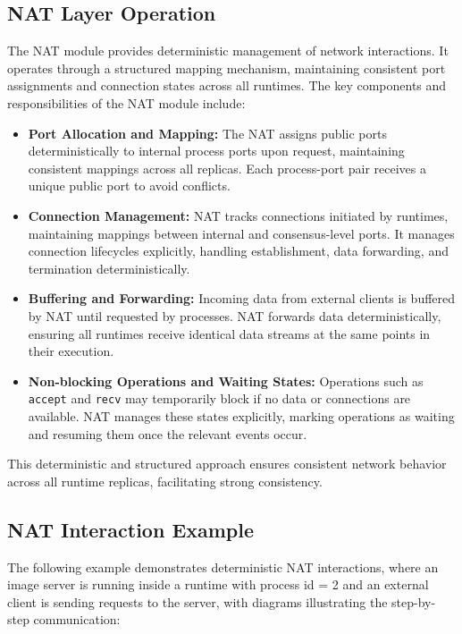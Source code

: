 \documentclass[10pt, 
]{IEEEtran}
\begin{document}
\subsection{NAT Layer Operation}

The NAT module provides deterministic management of network interactions. It operates through a structured mapping mechanism, maintaining consistent port assignments and connection states across all runtimes. The key components and responsibilities of the NAT module include:

\begin{itemize}
\item \textbf{Port Allocation and Mapping:} The NAT assigns public ports deterministically to internal process ports upon request, maintaining consistent mappings across all replicas. Each process-port pair receives a unique public port to avoid conflicts.
\item \textbf{Connection Management:} NAT tracks connections initiated by runtimes, maintaining mappings between internal and consensus-level ports. It manages connection lifecycles explicitly, handling establishment, data forwarding, and termination deterministically.
\item \textbf{Buffering and Forwarding:} Incoming data from external clients is buffered by NAT until requested by processes. NAT forwards data deterministically, ensuring all runtimes receive identical data streams at the same points in their execution.
\item \textbf{Non-blocking Operations and Waiting States:} Operations such as \texttt{accept} and \texttt{recv} may temporarily block if no data or connections are available. NAT manages these states explicitly, marking operations as waiting and resuming them once the relevant events occur.
\end{itemize}

This deterministic and structured approach ensures consistent network behavior across all runtime replicas, facilitating strong consistency.


\subsection{NAT Interaction Example}

The following example demonstrates deterministic NAT interactions, where an image server is running inside a runtime with process id = 2 and an external client is sending requests to the server, with diagrams illustrating the step-by-step communication:
\end{document}
